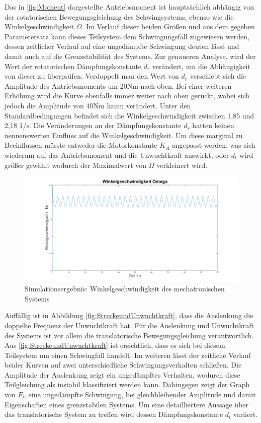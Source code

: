 Das in \ref{fig:Moment} dargestellte Antriebsmoment ist hauptsächlich abhängig von der rotatorischen Bewegungsgleichung des Schwingsystems, ebenso wie die Winkelgeschwindigkeit $\Omega$. Im Verlauf dieser beiden Größen und aus dem gegeben Parametersatz kann dieses Teilsystem dem Schwingungsfall zugewiesen werden, dessen zeitlicher Verlauf auf eine ungedämpfte Schwingung deuten lässt und damit auch auf die Grenzstabilität des Systems. Zur genaueren Analyse, wird der Wert der rotatorischen Dämpfungskonstante $d_r$ verändert, um die Abhängigkeit von dieser zu überprüfen. 
Verdoppelt man den Wert von $d_r$ verschiebt sich die Amplitude des Antriebsmoments um 20Nm nach oben. Bei einer weiteren Erhöhung wird die Kurve ebenfalls immer weiter nach oben gerückt, wobei sich jedoch die Amplitude von 40Nm kaum verändert. 
\newpage
Unter den Standardbedingungen befindet sich die Winkelgeschwindigkeit zwischen 1,85 und 2,18 1/s. Die Veränderungen an der Dämpfungskonstante $d_r$ hatten keinen nennenswerten Einfluss auf die Winkelgeschwindigkeit. Um diese marginal zu Beeinflussen müsste entweder die Motorkonstante $K_A$ angepasst werden, was sich wiederum auf das Antriebsmoment und die Unwuchtkraft auswirkt, oder $d_t$ wird größer gewählt wodurch der Maximalwert von $\Omega$ verkleinert wird.

\begin{figure}[hbt]
	\centering
	\includegraphics[width=1\linewidth]{Images/Omega}
	\caption{Simulationsergebnis: Winkelgeschwindigkeit des mechatronischen Systems}
	\label{fig:Omega}
\end{figure}

Auffällig ist in Abbildung \ref{fig:StreckeundUnwuchtkraft}, dass die Auslenkung die doppelte Frequenz der Unwuchtkraft hat.
Für die Auslenkung und Unwuchtkraft des Systems ist vor allem die translatorische Bewegungsgleichung verantwortlich. Aus \ref{fig:StreckeundUnwuchtkraft} ist ersichtlich, dass es sich bei diesem Teilsystem um einen Schwingfall handelt. Im weiteren lässt der zeitliche Verlauf beider Kurven auf zwei unterschiedliche Schwingungsverhalten schließen. Die Amplitude der Auslenkung zeigt ein ungedämpftes Verhalten, wodurch diese Teilgleichung als instabil klassifiziert werden kann. Dahingegen zeigt der Graph von $F_U$ eine ungedämpfte Schwingung, bei gleichbleibender Amplitude und damit Eigenschaften eines grenzstabilen Systems. Um eine detailliertere Aussage über das translatorische System zu treffen wird dessen Dämpfungskonstante $d_t$ variiert. 

